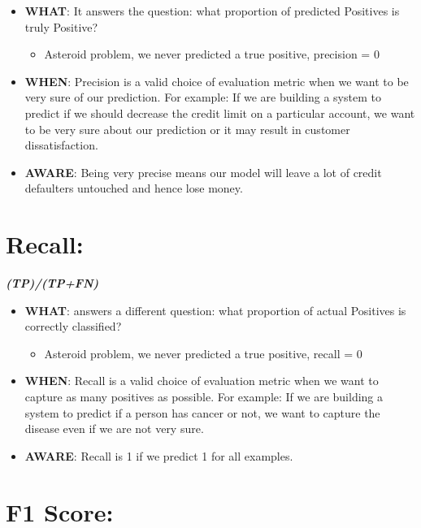 \documentclass[
]{book}
\providecommand{\tightlist}{%
  \setlength{\itemsep}{0pt}\setlength{\parskip}{0pt}}
\begin{document}
\begin{itemize}
\item
  \textbf{WHAT}: It answers the question: what proportion of predicted Positives is truly Positive?

  \begin{itemize}
  \tightlist
  \item
    Asteroid problem, we never predicted a true positive, precision = 0
  \end{itemize}
\item
  \textbf{WHEN}: Precision is a valid choice of evaluation metric when we want to be very sure of our prediction. For example: If we are building a system to predict if we should decrease the credit limit on a particular account, we want to be very sure about our prediction or it may result in customer dissatisfaction.
\item
  \textbf{AWARE}: Being very precise means our model will leave a lot of credit defaulters untouched and hence lose money.
\end{itemize}

\hypertarget{recall}{%
\section{Recall:}\label{recall}}

\textbf{\emph{(TP)/(TP+FN)}}

\begin{itemize}
\item
  \textbf{WHAT}: answers a different question: what proportion of actual Positives is correctly classified?

  \begin{itemize}
  \tightlist
  \item
    Asteroid problem, we never predicted a true positive, recall = 0
  \end{itemize}
\item
  \textbf{WHEN}: Recall is a valid choice of evaluation metric when we want to capture as many positives as possible. For example: If we are building a system to predict if a person has cancer or not, we want to capture the disease even if we are not very sure.
\item
  \textbf{AWARE}: Recall is 1 if we predict 1 for all examples.
\end{itemize}

\hypertarget{f1-score}{%
\section{F1 Score:}\label{f1-score}}
\end{document}
